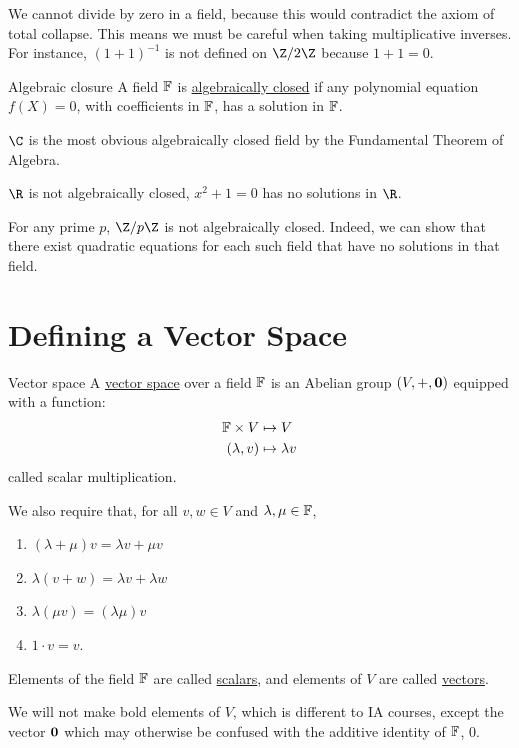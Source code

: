 \documentclass[../Main.tex]{subfiles}
\begin{document}
We cannot divide by zero in a field, because this would contradict the axiom of total collapse. This means we must be careful when taking multiplicative inverses. For instance, $(1 + 1)^{-1}$ is not defined on $\Z / 2\Z$ because $1 + 1 = 0$.
\begin{definition}{Algebraic closure}
    A field $\mathbb{F}$ is \underline{algebraically closed} if any polynomial equation $f(X) = 0$, with coefficients in $\mathbb{F}$, has a solution in $\mathbb{F}$.
\end{definition}
\begin{example}
    $\C$ is the most obvious algebraically closed field by the Fundamental Theorem of Algebra.
\end{example}
\begin{examples}
    \item $\R$ is not algebraically closed, $x^2 + 1 = 0$ has no solutions in $\R$.
    \item For any prime $p$, $\Z / p\Z$ is not algebraically closed. Indeed, we can show that there exist quadratic equations for each such field that have no solutions in that field.
\end{examples}
\section{Defining a Vector Space}
\begin{definition}{Vector space}
    A \underline{vector space} over a field $\mathbb{F}$ is an Abelian group $(V, +, \boldsymbol{0})$ equipped with a function:
    \begin{align*}
        \mathbb{F} \times V &\mapsto V \\
        (\lambda, v) &\mapsto \lambda v
    \end{align*}
    called scalar multiplication.

    We also require that, for all $v, w \in V$ and $\lambda, \mu \in \mathbb{F}$,
    \begin{enumerate}
        \item $(\lambda + \mu)v = \lambda v + \mu v$
        \item $\lambda (v + w) = \lambda v + \lambda w$
        \item $\lambda (\mu v) = (\lambda \mu)v$
        \item $1 \cdot v = v$.
    \end{enumerate}
    Elements of the field $\mathbb{F}$ are called \underline{scalars}, and elements of $V$ are called \underline{vectors}.
\end{definition}
We will not make bold elements of $V$, which is different to IA courses, except the vector $\boldsymbol{0}$ which may otherwise be confused with the additive identity of $\mathbb{F}$, $0$.
\end{document}
